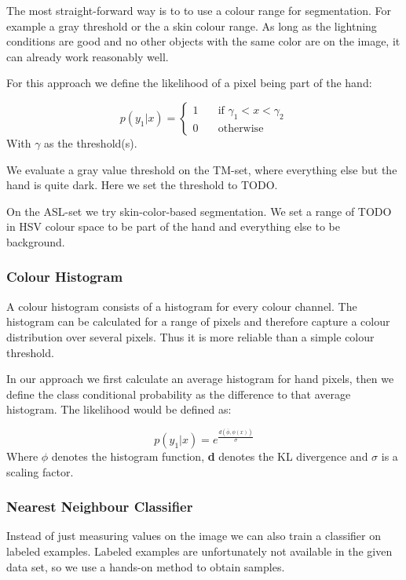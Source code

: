 \documentclass[letterpaper, 10 pt, conference]{ieeeconf}  %
\begin{document}
The most straight-forward way is to to use a colour range for segmentation. For example a gray threshold or the a skin colour range. As long as the lightning conditions are good and no other objects with the same color are on the image, it can already work reasonably well. 

For this approach we define the likelihood of a pixel being part of the hand:

\begin{equation}
p(y_1 | x) = \begin{cases}
1 & \quad \text{if } \gamma_1 < x < \gamma_2 \\
0 & \quad \text{otherwise}
\end{cases}
\end{equation}
With $\gamma$ as the threshold(s).

We evaluate a gray value threshold on the TM-set, where everything else but the hand is quite dark. Here we set the threshold to TODO.

On the ASL-set we try skin-color-based segmentation. We set a range of TODO in HSV colour space to be part of the hand and everything else to be background.

\subsubsection{Colour Histogram}

A colour histogram consists of a histogram for every colour channel. The histogram can be calculated for a range of pixels and therefore capture a colour distribution over several pixels. Thus it is more reliable than a simple colour threshold.

In our approach we first calculate an average histogram for hand pixels, then we define the class conditional probability as the difference to that average histogram. The likelihood would be defined as:

\begin{equation}
p(y_1 | x) = e^{\frac{d(\bar{\phi},\phi(x))}{\sigma}}
\end{equation}
Where $\phi$ denotes the histogram function, \textbf{d} denotes the KL divergence and $\sigma$ is a scaling factor.

\subsubsection{Nearest Neighbour Classifier}

Instead of just measuring values on the image we can also train a classifier on labeled examples. Labeled examples are unfortunately not available in the given data set, so we use a hands-on method to obtain samples. 
\end{document}
